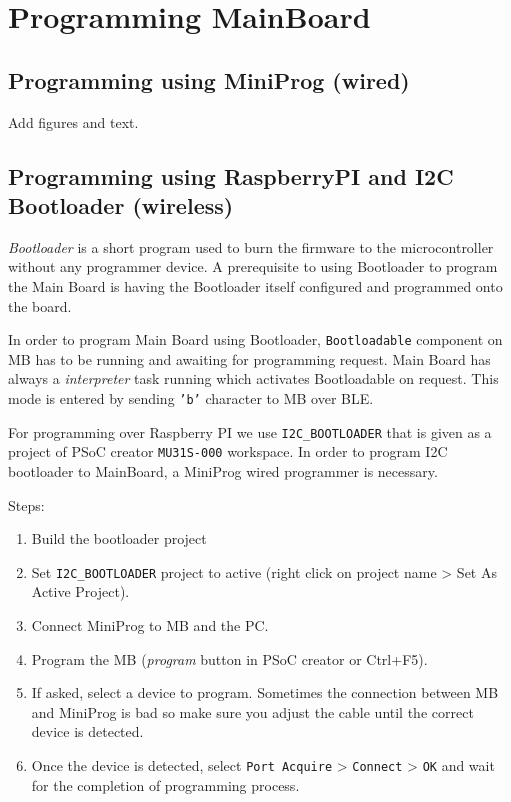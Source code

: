 \chapter{Programming MainBoard}

\section{Programming using MiniProg (wired)}
Add figures and text.

\section{Programming using RaspberryPI and I2C Bootloader (wireless)}
\emph{Bootloader} is a short program used to burn the firmware to the microcontroller without any programmer device. A prerequisite to using Bootloader to program the Main Board is having the Bootloader itself configured and programmed onto the board. 

In order to program Main Board using Bootloader, \texttt{Bootloadable} component on MB has to be running and awaiting for programming request. Main Board has always a \textit{interpreter} task running which activates Bootloadable on request. This mode is entered by sending \texttt{'b'} character to MB over BLE.

For programming over Raspberry PI we use  \texttt{I2C\_BOOTLOADER} that is given as a project of PSoC creator \texttt{MU31S-000} workspace. In order to program I2C bootloader to MainBoard, a MiniProg wired programmer is necessary. 

Steps:
\begin{enumerate}
	\item Build the bootloader project
	\item Set \texttt{I2C\_BOOTLOADER} project to active (right click on project name > Set As Active Project).
	\item Connect MiniProg to MB and the PC.
	\item Program the MB (\textit{program} button in PSoC creator or Ctrl+F5).
	\item If asked, select a device to program. Sometimes the connection between MB and MiniProg is bad so make sure you adjust the cable until the correct device is detected. 
		\item Once the device is detected, select \texttt{Port Acquire} > \texttt{Connect} > \texttt{OK} and wait for the completion of programming process.
\end{enumerate}


